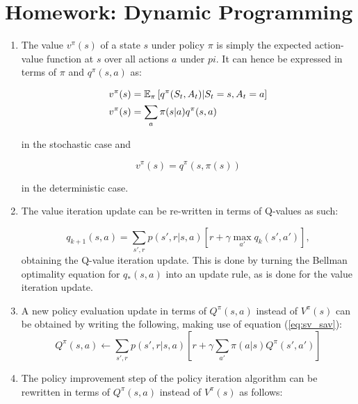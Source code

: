 \documentclass[
]{article}
\begin{document}
\hypertarget{homework-dynamic-programming}{%
\section*{Homework: Dynamic
Programming}\label{homework-dynamic-programming}}

\begin{enumerate}
\def\labelenumi{\arabic{enumi}.}
\item
  The value \(v^\pi(s)\) of a state \(s\) under policy \(\pi\) is simply
  the expected action-value function at \(s\) over all actions \(a\)
  under \(pi\). It can hence be expressed in terms of \(\pi\) and
  \(q^\pi(s, a)\) as:

  \begin{align}
     v^\pi(s) &= \mathbb{E}_\pi\left[q^\pi(S_t, A_t) | S_t = s, A_t=a\right]\notag\\ 
     v^\pi(s) &= \sum_a \pi(s|a) q^\pi(s, a) \label{eq:sv_sav}
  \end{align}

  in the stochastic case and

  \begin{equation}
     v^\pi(s) =  q^\pi(s, \pi(s))
  \end{equation}

  in the deterministic case.

\item
  The value iteration update can be re-written in terms of Q-values as such:
  
  \begin{equation}
    q_{k+1}(s, a) = \sum_{s', r} p(s', r | s, a)\left[r + \gamma \max_{a'} q_k(s', a')\right],
  \end{equation}
  obtaining the Q-value iteration update. This is done by turning the Bellman optimality equation
  for $q_*(s, a)$ into an update rule, as is done for the value iteration update.

\item
  A new policy evaluation update in terms of $Q^\pi(s, a)$ instead of $V^\pi(s)$ can be obtained by
  writing the following, making use of equation (\ref{eq:sv_sav}):
  \begin{equation}
    Q^\pi(s, a) \leftarrow \sum_{s', r} p(s', r| s, a)\left[r + \gamma \sum_{a'}\pi(a|s)Q^\pi(s', a')\right]
  \end{equation}
\item

  The policy improvement step of the policy iteration algorithm can be rewritten in terms of
  $Q^\pi(s, a)$ instead of $V^\pi(s)$ as follows:


\end{enumerate}
\end{document}
